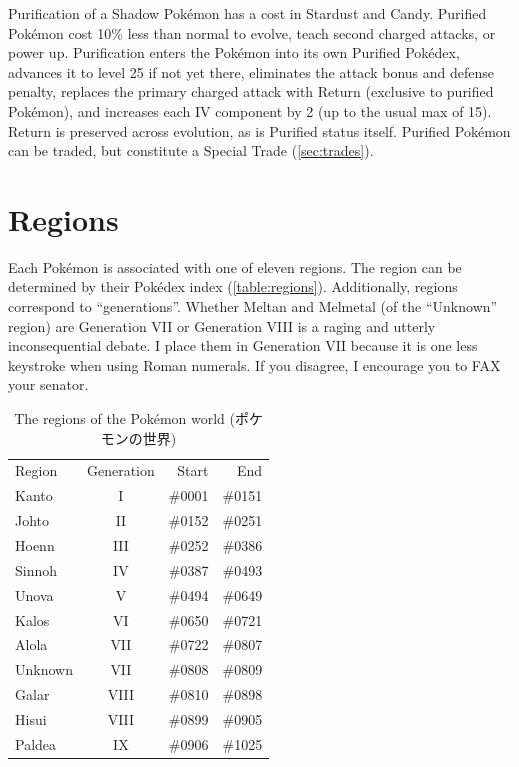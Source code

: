 Purification of a Shadow Pokémon has a cost in Stardust and Candy.
Purified Pokémon cost 10\% less than normal to evolve, teach second charged attacks, or power up.
Purification enters the Pokémon into its own Purified Pokédex,
 advances it to level 25 if not yet there,
 eliminates the attack bonus and defense penalty,
 replaces the primary charged attack with Return (exclusive to purified Pokémon),
 and increases each IV component by 2  (up to the usual max of 15).
Return is preserved across evolution, as is Purified status itself.
Purified Pokémon can be traded, but constitute a Special Trade (\autoref{sec:trades}).

\section{Regions}
\label{sec:regions}
Each Pokémon is associated with one of eleven regions.
The region can be determined by their Pokédex index (\autoref{table:regions}).
Additionally, regions correspond to ``generations''.
Whether Meltan and Melmetal (of the ``Unknown'' region) are Generation VII
  or Generation VIII is a raging and utterly inconsequential debate.
I place them in Generation VII because it is one less keystroke when using Roman numerals.
If you disagree, I encourage you to FAX your senator.
\begin{table}[ht]
  \begin{center}
    \begin{tabular}{lcrr}
      Region & Generation & Start & End\\
      \Midrule
      Kanto & I & \#0001 & \#0151\\
      Johto & II & \#0152 & \#0251\\
      Hoenn & III & \#0252 & \#0386\\
      Sinnoh & IV & \#0387 & \#0493\\
      Unova & V & \#0494 & \#0649\\
      Kalos & VI & \#0650 & \#0721\\
      Alola & VII & \#0722 & \#0807\\
      Unknown & VII & \#0808 & \#0809\\
      Galar & VIII & \#0810 & \#0898\\
      Hisui & VIII & \#0899 & \#0905\\
      Paldea & IX & \#0906 & \#1025\\
    \end{tabular}
  \end{center}
  \caption{The regions of the Pokémon world (\textjapanese{ポケモンの世界})}
  \label{table:regions}
\end{table}

